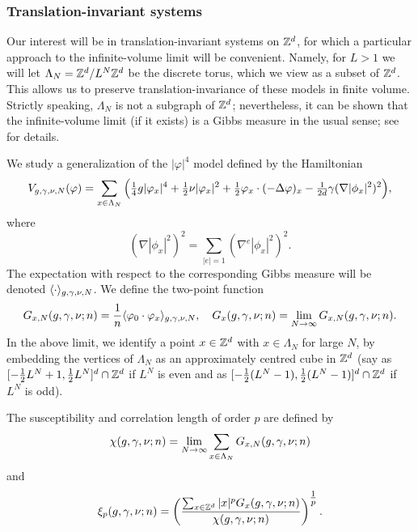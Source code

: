 \subsubsection{Translation-invariant systems}

Our interest will be in translation-invariant systems on ${ {{\mathbb Z}}^d }$, for which a particular approach to the infinite-volume limit will be convenient. Namely, for $L > 1$ we will let $\Lambda_N = { {{\mathbb Z}}^d }/L^N{ {{\mathbb Z}}^d }$ be the discrete torus, which we view as a subset of ${ {{\mathbb Z}}^d }$. This allows us to preserve
translation-invariance of these models in finite volume. Strictly speaking, $\Lambda_N$ is not a subgraph of ${ {{\mathbb Z}}^d }$; nevertheless, it can be shown that the infinite-volume limit (if it exists) is a Gibbs measure in the usual sense; see \cite[Example 4.20]{Georgii11} for details.


We study a generalization of the $|\varphi|^4$ model defined by the Hamiltonian
\begin{equation}
\label{e:Vdef1}
V_{g,\gamma,\nu,N}(\varphi)
	=
\sum_{x\in\Lambda_N}
\Big(
	\tfrac{1}{4} g |\varphi_x|^4
		+
	\tfrac{1}{2} \nu |\varphi_x|^2
		+
	\tfrac{1}{2} \varphi_x \cdot (-\Delta \varphi)_x
		-
	\tfrac{1}{2 d} \gamma (\nabla |\phi_x|^2)^2
\Big),
\end{equation}
where
\begin{equation}
(\nabla |\phi_x|^2)^2
	=
\sum_{|e|=1} (\nabla^e |\phi_x|^2)^2.
\end{equation}
The expectation with respect to the corresponding Gibbs measure will
be denoted $\langle\cdot\rangle_{g,\gamma,\nu,N}$.
We define the two-point function
\begin{equation}
\label{e:two-point-function-phi4}
G_{x, N}(g,\gamma,\nu; n)
	=
\frac{1}{n} \langle \varphi_0 \cdot \varphi_x \rangle_{g,\gamma,\nu,N},
	\quad
G_x(g,\gamma,\nu; n)
	=
\lim_{N \rightarrow \infty} G_{x, N}(g,\gamma,\nu; n).
\end{equation}
In the above limit, we identify a point $x \in { {{\mathbb Z}}^d }$ with $x \in \Lambda_N$
for large $N$, by embedding the vertices of $\Lambda_N$ as an approximately
centred cube in ${\mathbb Z}^d$ (say as $[-\frac12 L^N+1,\frac12 L^N]^d \cap {\mathbb Z}^d$ if $L^N$ is even
and as $[-\frac12 (L^N-1), \frac12 (L^N-1)]^d \cap {\mathbb Z}^d$ if $L^N$ is odd).

The susceptibility and correlation length of order $p$ are defined by
\begin{equation}
\chi(g, \gamma, \nu; n)
	=
\lim_{N\rightarrow\infty} \sum_{x\in\Lambda_N} G_{x,N}(g, \gamma, \nu; n)
\end{equation}
and
\begin{equation}
\xi_p(g, \gamma, \nu; n)
	=
\left(
\frac{\sum_{x\in{ {{\mathbb Z}}^d }} |x|^p G_x(g, \gamma, \nu; n)}{\chi(g, \gamma, \nu; n)}
\right)^{\tfrac{1}{p}}.
\end{equation}

